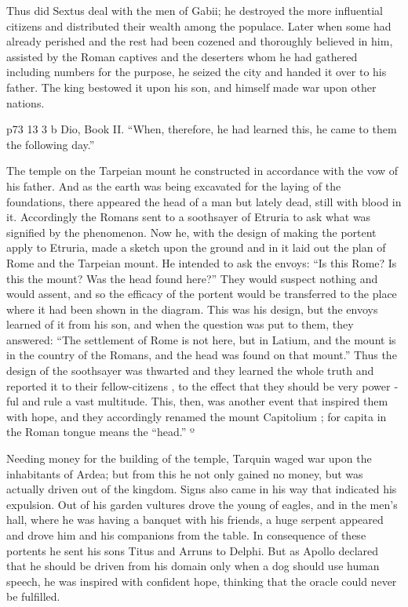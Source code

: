 Thus did Sextus deal with the men of Gabii; he destroyed the more influential citizens and distributed their wealth among the populace. Later when some had already perished and the rest had been cozened and thoroughly believed in him, assisted by the Roman captives and the deserters whom he had gathered including numbers for the purpose, he seized the city and handed it over to his father. The king bestowed it upon his son, and himself made war upon other nations.

p73
13
3 b Dio, Book II. ``When, therefore, he had learned this, he came to them the following day.''

The temple on the Tarpeian mount he constructed in accordance with the vow of his father. And as the earth was being excavated for the laying of the foundations, there appeared the head of a man but lately dead, still with blood in it. Accordingly the Romans sent to a soothsayer of Etruria to ask what was signified by the phenomenon. Now he, with the design of making the portent apply to Etruria, made a sketch upon the ground and in it laid out the plan of Rome and the Tarpeian mount. He intended to ask the envoys: ``Is this Rome? Is this the mount? Was the head found here?'' They would suspect nothing and would assent, and so the efficacy of the portent would be transferred to the place where it had been shown in the diagram. This was his design, but the envoys learned of it from his son, and when the question was put to them, they answered: ``The settlement of Rome is not here, but in Latium, and the mount is in the country of the Romans, and the head was found on that mount.'' Thus the design of the soothsayer was thwarted and they learned the whole truth and reported it to their fellow-citizens , to the effect that they should be very power ­ful and rule a vast multitude. This, then, was another event that inspired them with hope, and they accordingly renamed the mount Capitolium ; for capita in the Roman tongue means the ``head.'' º

Needing money for the building of the temple, Tarquin waged war upon the inhabitants of Ardea; but from this he not only gained no money, but was actually driven out of the kingdom. Signs also came in his way that indicated his expulsion. Out of his garden vultures drove the young of eagles, and in the men's hall, where he was having a banquet with his friends, a huge serpent appeared and drove him and his companions from the table. In consequence of these portents he sent his sons Titus and Arruns to Delphi. But as Apollo declared that he should be driven from his domain only when a dog should use human speech, he was inspired with confident hope, thinking that the oracle could never be fulfilled.

